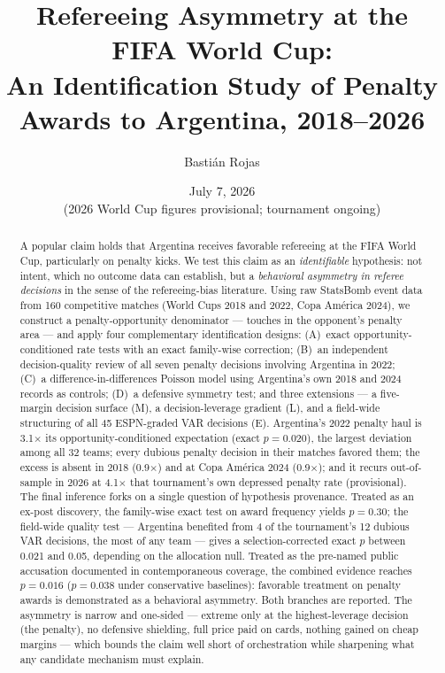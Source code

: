 \documentclass[11pt,a4paper]{article}
\title{\textbf{Refereeing Asymmetry at the FIFA World Cup:\\
An Identification Study of Penalty Awards to Argentina, 2018--2026}}
\author[1]{Bastián Rojas}
\affil[1]{\small Independent analysis. Code, data, and full provenance:
\url{https://github.com/BastyanRojas/argentina-worldcup-referee-analysis}}
\date{July 7, 2026 \\[2pt] \small (2026 World Cup figures provisional; tournament ongoing)}
\newcommand{\pv}[1]{\ensuremath{p = #1}}
\begin{document}
\maketitle

\begin{abstract}
\noindent
A popular claim holds that Argentina receives favorable refereeing at the FIFA World
Cup, particularly on penalty kicks. We test this claim as an \emph{identifiable}
hypothesis: not intent, which no outcome data can establish, but a \emph{behavioral
asymmetry in referee decisions} in the sense of the refereeing-bias literature. Using
raw StatsBomb event data from 160 competitive matches (World Cups 2018 and 2022, Copa
Am\'erica 2024), we construct a penalty-opportunity denominator --- touches in the
opponent's penalty area --- and apply four complementary identification designs:
(A)~exact opportunity-conditioned rate tests with an exact family-wise correction;
(B)~an independent decision-quality review of all seven penalty decisions involving
Argentina in 2022; (C)~a difference-in-differences Poisson model using Argentina's own
2018 and 2024 records as controls; (D)~a defensive symmetry test; and three
extensions --- a five-margin decision surface (M), a decision-leverage gradient (L),
and a field-wide structuring of all 45 ESPN-graded VAR decisions (E). Argentina's 2022
penalty haul is 3.1$\times$ its opportunity-conditioned expectation (exact
\pv{0.020}), the largest deviation among all 32 teams; every dubious penalty decision
in their matches favored them; the excess is absent in 2018 (0.9$\times$) and at Copa
Am\'erica 2024 (0.9$\times$); and it recurs out-of-sample in 2026 at 4.1$\times$ that
tournament's own depressed penalty rate (provisional). The
final inference forks on a single question of hypothesis provenance. Treated as an
ex-post discovery, the family-wise exact test on award frequency yields \pv{0.30};
the field-wide quality test --- Argentina benefited from 4 of the tournament's 12
dubious VAR decisions, the most of any team --- gives a selection-corrected exact
$p$ between 0.021 and 0.05, depending on the allocation null. Treated as the
pre-named public accusation documented in contemporaneous coverage, the
combined evidence reaches \pv{0.016} (\pv{0.038} under conservative baselines):
favorable treatment on penalty awards is demonstrated as a behavioral asymmetry. Both
branches are reported. The asymmetry is narrow and one-sided --- extreme only at the
highest-leverage decision (the penalty), no defensive shielding, full price paid on
cards, nothing gained on cheap margins --- which bounds the claim well short of
orchestration while sharpening what any candidate mechanism must explain.
\end{abstract}
\end{document}
